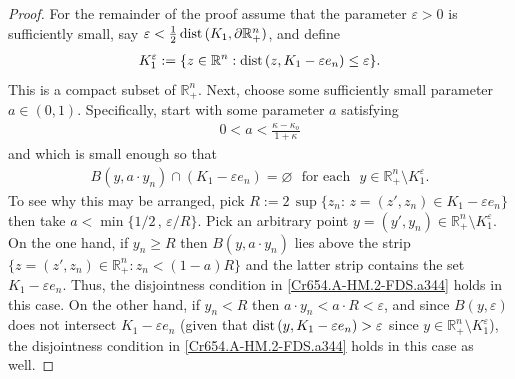 \documentclass[11pt,reqno]{amsart}
\numberwithin{equation}{section}
\theoremstyle{remark}
\begin{document}
\begin{proof}
For the remainder of the proof assume that the parameter $\varepsilon>0$ is sufficiently small, say 
$\varepsilon<\frac{1}{2}\,{\rm dist}\,(K_1,\partial{\mathbb{R}}^n_{+})$, and define 
%
\begin{align}\label{Cr654.A-HM.2-FDS.aTgab}
K_1^\varepsilon:=\{z\in{\mathbb{R}}^n:{\rm dist}\,(z,K_1-\varepsilon e_n)\leq\varepsilon\}.
\end{align}
%
This is a compact subset of ${\mathbb{R}}^n_{+}$. Next, choose some sufficiently small 
parameter $a\in(0,1)$. Specifically, start with some parameter $a$ satisfying 
%
\begin{align}\label{Cr654.A-HM.2-FDS.aaa}
0<a<\frac{\kappa-\kappa_o}{1+\kappa}
\end{align}
%
and which is small enough so that 
%
\begin{align}\label{Cr654.A-HM.2-FDS.a344}
B(y,a\cdot y_n)\cap(K_1-\varepsilon e_n)=\varnothing\,\,\text{ for each }\,\,
y\in{\mathbb{R}}^n_{+}\setminus K_1^\varepsilon.
\end{align}
%
To see why this may be arranged, pick $R:=2\,\sup\{z_n:\,z=(z',z_n)\in K_1-\varepsilon e_n\}$
then take $a<\min\big\{1/2\,,\,\varepsilon/R\big\}$. Pick an arbitrary point 
$y=(y',y_n)\in{\mathbb{R}}^n_{+}\setminus K_1^\varepsilon$. On the one hand, if $y_n\geq R$ then 
$B(y,a\cdot y_n)$ lies above the strip $\{z=(z',z_n)\in{\mathbb{R}}^n_{+}:z_n<(1-a)R\}$ 
and the latter strip contains the set $K_1-\varepsilon e_n$. Thus, the disjointness condition in 
\eqref{Cr654.A-HM.2-FDS.a344} holds in this case. On the other hand, if $y_n<R$ then 
$a\cdot y_n<a\cdot R<\varepsilon$, and since $B(y,\varepsilon)$ does not intersect 
$K_1-\varepsilon e_n$ (given that ${\rm dist}\,(y,K_1-\varepsilon e_n)>\varepsilon$
since $y\in{\mathbb{R}}^n_{+}\setminus K_1^\varepsilon$), the disjointness condition
in \eqref{Cr654.A-HM.2-FDS.a344} holds in this case as well. 


\end{proof}
\end{document}
